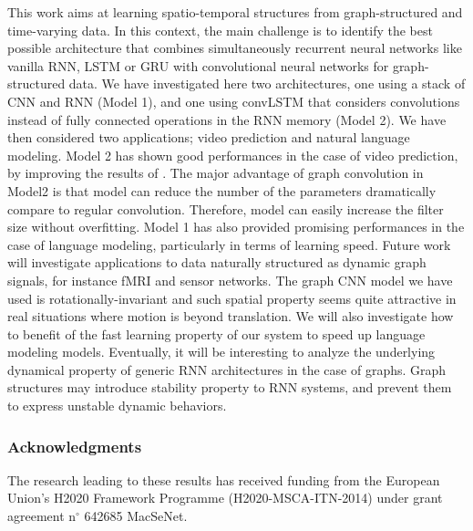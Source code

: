 \documentclass{article} %
\newcommand{\todo}[1]{{\color{red} #1 }}
\begin{document}
This work aims at learning spatio-temporal structures from graph-structured and time-varying data. In this context, the main challenge is to identify the best possible architecture that combines simultaneously recurrent neural networks like vanilla RNN, LSTM or GRU with convolutional neural networks for graph-structured data. We have investigated here two architectures, one using a stack of CNN and RNN (Model 1), and one using convLSTM that considers convolutions instead of fully connected operations in the RNN memory (Model 2). We have then considered two applications; video prediction and natural language modeling. Model 2 has shown good performances in the case of video prediction, by improving the results of \citet{convlstm}. The major advantage of graph convolution in Model2 is that model can reduce the number of the parameters dramatically compare to regular convolution. Therefore, model can easily increase the filter size without overfitting. Model 1 has also provided promising performances in the case of language modeling, particularly in terms of learning speed. Future work will investigate applications to data naturally structured as dynamic graph signals, for instance fMRI and sensor networks. The graph CNN model we have used is rotationally-invariant and such spatial property seems quite attractive in real situations where motion is beyond translation. We will also investigate how to benefit of the fast learning property of our system to speed up language modeling models. Eventually, it will be interesting to analyze the underlying dynamical property of generic RNN architectures in the case of graphs. Graph structures may introduce stability property to RNN systems, and prevent them to express unstable dynamic behaviors.



\subsubsection*{Acknowledgments}
The research leading to these results has received funding from the European Union's 
H2020 Framework Programme (H2020-MSCA-ITN-2014) under grant agreement n$^{\circ}$ 642685 MacSeNet.
{
	\small
	
	
}
\end{document}

